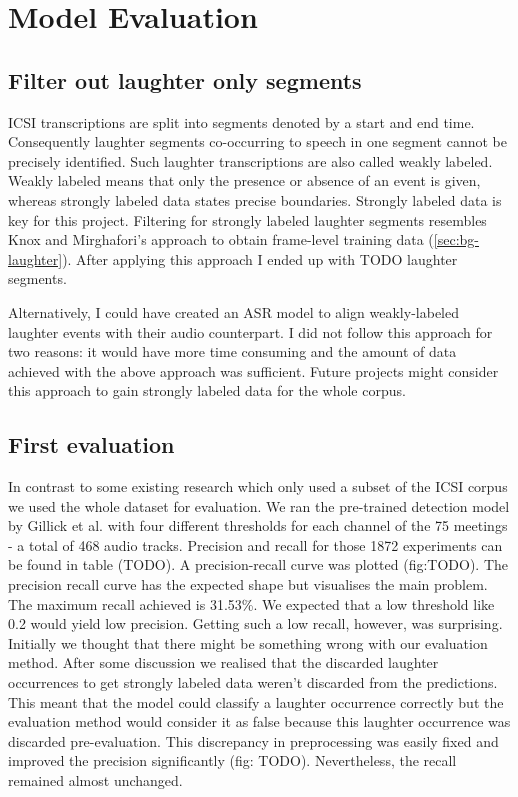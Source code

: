 \documentclass[bsc,frontabs,parskip,deptreport]{infthesis}
\begin{document}
\section{Model Evaluation} \label{sec:model-eval}

\subsection{Filter out laughter only segments} \label{subsec:filter-laughter}
ICSI transcriptions are split into segments denoted by a start and end time.
Consequently laughter segments co-occurring to speech in one segment cannot be precisely identified.
Such laughter transcriptions are also called weakly labeled. Weakly labeled means that only the presence or absence of an event is given, whereas strongly labeled data states precise boundaries.
Strongly labeled data is key for this project.
Filtering for strongly labeled laughter segments resembles Knox and Mirghafori's approach to obtain frame-level training data \citep{knox2006automatic} (\ref{sec:bg-laughter}). 
After applying this approach I ended up with TODO laughter segments.

Alternatively, I could have created an ASR model to align weakly-labeled laughter events with their audio counterpart. 
I did not follow this approach for two reasons: it would have more time consuming and the amount of data achieved with the above approach was sufficient. 
Future projects might consider this approach to gain strongly labeled data for the whole corpus. 

\subsection{First evaluation}
In contrast to some existing research \citep{kennedy2004laughter, knox2006automatic} which only used a subset of the ICSI corpus we used the whole dataset for evaluation. We ran the pre-trained detection model by Gillick et al. with four different thresholds for each channel of the 75 meetings - a total of 468 audio tracks. 
Precision and recall for those 1872 experiments can be found in table (TODO).
A precision-recall curve was plotted (fig:TODO). The precision recall curve has the expected shape but visualises the main problem. The maximum recall achieved is 31.53\%. We expected that a low threshold like 0.2 would yield low precision. Getting such a low recall, however, was surprising. 
Initially we thought that there might be something wrong with our evaluation method. After some discussion we realised that the discarded laughter occurrences to get strongly labeled data weren't discarded from the predictions. This meant that the model could classify a laughter occurrence correctly but the evaluation method would consider it as false because this laughter occurrence was discarded pre-evaluation. This discrepancy in preprocessing was easily fixed and improved the precision significantly (fig: TODO). Nevertheless, the recall remained almost unchanged. 
\end{document}
